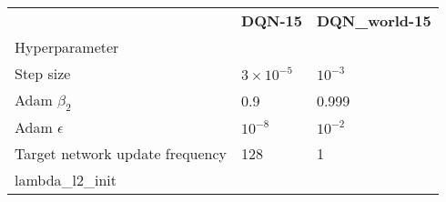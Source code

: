 \begin{tabular}{lll}
 & \bfseries DQN-15 & \bfseries DQN_world-15 \\
Hyperparameter &  &  \\
Step size & $3 \times 10^{-5}$ & $10^{-3}$ \\
Adam $\beta_2$ & 0.9 & 0.999 \\
Adam $\epsilon$ & $10^{-8}$ & $10^{-2}$ \\
Target network update frequency & 128 & 1 \\
lambda_l2_init &  &  \\
\end{tabular}
